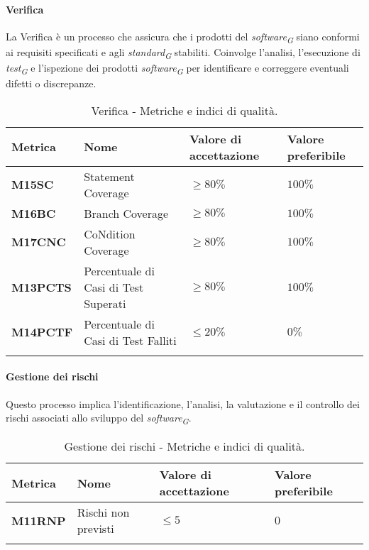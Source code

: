 \paragraph{Verifica}
La Verifica è un processo che assicura che i prodotti del \textit{software}\textsubscript{\textit{G}} siano conformi ai requisiti specificati e agli \textit{standard}\textsubscript{\textit{G}} stabiliti. Coinvolge l'analisi, l'esecuzione di \textit{test}\textsubscript{\textit{G}} e l'ispezione dei prodotti \textit{software}\textsubscript{\textit{G}} per identificare e correggere eventuali difetti o discrepanze.
\hspace{1pt}
\begin{longtable}{|C{1.5cm}|L{3cm}|L{2.5cm}|L{2.5cm}|}
    \hline
    \textbf{Metrica} & \textbf{Nome} & \textbf{Valore di accettazione} & \textbf{Valore preferibile} \\
    \hline
    \textbf{M15SC} & Statement Coverage & $\geq 80\%$ & $100\%$ \\
    \hline
    \textbf{M16BC} & Branch Coverage & $\geq 80\%$ & $100\%$ \\
    \hline
    \textbf{M17CNC} & CoNdition Coverage & $\geq 80\%$ & $100\%$ \\
    \hline
    \textbf{M13PCTS} & Percentuale di Casi di Test Superati & $\geq 80\%$ & $100\%$ \\
    \hline
    \textbf{M14PCTF} & Percentuale di Casi di Test Falliti & $\leq 20\%$ & $0\%$ \\
    \hline
\caption{Verifica - Metriche e indici di qualità.}
\label{tab:metriche_verifica}
\end{longtable}


\paragraph{Gestione dei rischi}
Questo processo implica l'identificazione, l'analisi, la valutazione e il controllo dei rischi associati allo sviluppo del \textit{software}\textsubscript{\textit{G}}. 
\hspace{1pt}
    \begin{longtable}{|C{1.5cm}|L{3cm}|L{2.5cm}|L{2.5cm}|}
        \hline
      \textbf{Metrica} & \textbf{Nome} & \textbf{Valore di accettazione} & \textbf{Valore preferibile} \\
      \hline
      \textbf{M11RNP}    & Rischi non previsti  & $\leq 5$ &   $0$ \\
      \hline
    \caption{Gestione dei rischi - Metriche e indici di qualità.}
    \label{tab:tabella2}
\end{longtable}


